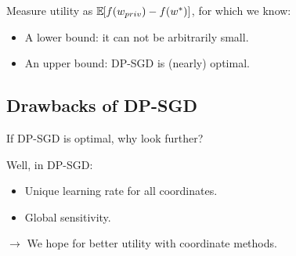 \documentclass{beamer}
\newcommand{\expec}[2]{\mathbb E_{#1} \hspace{-0.29em} \left[ #2 \right]}
\begin{document}
\begin{frame}

  Measure utility as $\expec{}{f(w_{priv}) - f(w^*)}$, for which we know:
  \begin{itemize}
  \item A \alert{lower bound}: it can not be arbitrarily small.
  \item An \alert{upper bound}: DP-SGD is (nearly) optimal.
  \end{itemize}

  \vspace{3em}


\end{frame}

\subsection{Drawbacks of DP-SGD}

\begin{frame}

  If DP-SGD is optimal, why look further?

  \pause

  Well, in DP-SGD:
  \begin{itemize}
  \item \alert{Unique} learning rate for all coordinates.
  \item \alert{Global} sensitivity.
  \end{itemize}

  \pause

  \vspace{2em}

  $\rightarrow$ We hope for better utility with \alert{coordinate methods}.



\end{frame}
\end{document}
